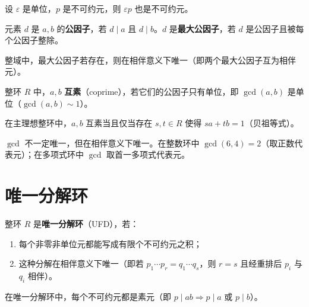 \begin{theorem}[定理 2：单位乘不可约元还是不可约元]
设 $\varepsilon$ 是单位，$p$ 是不可约元，则 $\varepsilon p$ 也是不可约元。
\end{theorem}

\begin{definition}[公因子与最大公因子]
元素 $d$ 是 $a, b$ 的\textbf{公因子}，若 $d \mid a$ 且 $d \mid b$。$d$ 是\textbf{最大公因子}，若 $d$ 是公因子且被每个公因子整除。
\end{definition}

\begin{theorem}[定理 3：最大公因子与单位因子]
整域中，最大公因子若存在，则在相伴意义下唯一（即两个最大公因子互为相伴元）。
\end{theorem}

\begin{definition}[互素]
整环 $R$ 中，$a, b$ \textbf{互素}（coprime），若它们的公因子只有单位，即 $\gcd(a,b)$ 是单位（$\gcd(a,b) \sim 1$）。
\end{definition}

\begin{proposition}
在主理想整环中，$a, b$ 互素当且仅当存在 $s, t \in R$ 使得 $sa + tb = 1$（贝祖等式）。
\end{proposition}

\begin{note}
$\gcd$ 不一定唯一，但在相伴意义下唯一。在整数环中 $\gcd(6, 4) = 2$（取正数代表元）；在多项式环中 $\gcd$ 取首一多项式代表元。
\end{note}

\section{唯一分解环}

\begin{definition}
整环 $R$ 是\textbf{唯一分解环}（UFD），若：
\begin{enumerate}
  \item 每个非零非单位元都能写成有限个不可约元之积；
  \item 这种分解在相伴意义下唯一（即若 $p_1 \cdots p_r = q_1 \cdots q_s$，则 $r = s$ 且经重排后 $p_i$ 与 $q_i$ 相伴）。
\end{enumerate}
\end{definition}

\begin{theorem}
在唯一分解环中，每个不可约元都是素元（即 $p \mid ab \Rightarrow p \mid a$ 或 $p \mid b$）。
\end{theorem}

